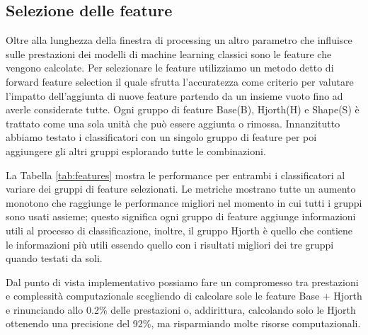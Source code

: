 \subsection{Selezione delle feature}
\label{ssec:selezione-delle-feature}

Oltre alla lunghezza della finestra di processing un altro parametro che influisce sulle prestazioni dei modelli di machine learning classici sono le feature che vengono calcolate. Per selezionare le feature utilizziamo un metodo detto di forward feature selection il quale sfrutta l'accuratezza come criterio per valutare l'impatto dell'aggiunta di nuove feature partendo da un insieme vuoto fino ad averle considerate tutte. Ogni gruppo di feature Base(B), Hjorth(H) e Shape(S) è trattato come una sola unità che può essere aggiunta o rimossa. Innanzitutto abbiamo testato i classificatori con un singolo gruppo di feature per poi aggiungere gli altri gruppi esplorando tutte le combinazioni.

La Tabella \ref{tab:features} mostra le performance per entrambi i classificatori al variare dei gruppi di feature selezionati. Le metriche mostrano tutte un aumento monotono che raggiunge le performance migliori nel momento in cui tutti i gruppi sono usati assieme; questo significa ogni gruppo di feature aggiunge informazioni utili al processo di classificazione, inoltre, il gruppo Hjorth è quello che contiene le informazioni più utili essendo quello con  i risultati migliori dei tre gruppi quando testati da soli. 

Dal punto di vista implementativo possiamo fare un compromesso tra prestazioni e complessità computazionale scegliendo di calcolare sole le feature Base + Hjorth e rinunciando allo 0.2\% delle prestazioni o, addirittura, calcolando solo le Hjorth ottenendo una precisione del 92\%, ma risparmiando molte risorse computazionali.


